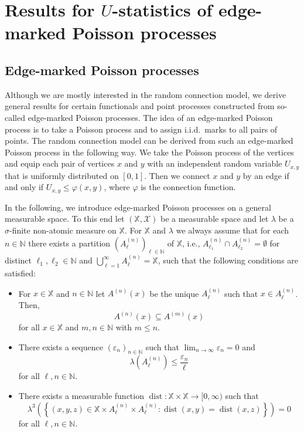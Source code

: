 \documentclass{article}
\theoremstyle{definition}
\numberwithin{equation}{section}
\theoremstyle{remark}
\begin{document}
\section{Results for $U$-statistics of edge-marked Poisson processes}\label{Sec:edge}



\subsection{Edge-marked Poisson processes}\label{subsec:edge-marked_PP}

Although we are mostly interested in the random connection model, we derive general results for certain functionals and point processes constructed from so-called edge-marked Poisson processes. The idea of an edge-marked Poisson process is to take a Poisson process and to assign i.i.d.\ marks to all pairs of points. The random connection model can be derived from such an edge-marked Poisson process in the following way. We take the Poisson process of the vertices and equip each pair of vertices $x$ and $y$ with an independent random variable $U_{x,y}$ that is uniformly distributed on $[0,1]$. Then we connect $x$ and $y$ by an edge if and only if $U_{x,y}\leq \varphi(x,y)$, where $\varphi$ is the connection function.

In the following, we introduce edge-marked Poisson processes on a general measurable space. To this end let $(\mathbb{X},\mathcal{X})$ be a measurable space and let $\lambda$ be a $\sigma$-finite non-atomic measure on $\mathbb{X}$. For $\mathbb{X}$ and $\lambda$ we always assume that for each $n\in\mathbb{N}$ there exists a partition $(A_\ell^{(n)})_{\ell\in\mathbb{N}}$ of $\mathbb{X}$, i.e., $A^{(n)}_{\ell_1}\cap A^{(n)}_{\ell_2}=\emptyset$ for distinct $\ell_1,\ell_2\in\mathbb{N}$ and $\bigcup_{\ell=1}^\infty A^{(n)}_\ell=\mathbb{X}$, such that the following conditions are satisfied:
\begin{itemize}
\item For $x\in\mathbb{X}$ and $n\in\mathbb{N}$ let $A^{(n)}(x)$ be the unique $A^{(n)}_\ell$ such that $x\in A^{(n)}_\ell$. Then,
\begin{equation}\label{eqn:monotonicity_partition}
A^{(n)}(x)\subseteq A^{(m)}(x)
\end{equation}
for all $x\in\mathbb{X}$ and $m,n\in\mathbb{N}$ with $m\leq n$.
\item There exists a sequence $(\varepsilon_n)_{n\in\mathbb{N}}$ such that $\lim_{n\to\infty}\varepsilon_n=0$ and
\begin{equation}\label{eqn:size_partition}
\lambda(A_\ell^{(n)}) \leq \frac{\varepsilon_n}{\ell}
\end{equation}
for all $\ell,n\in\mathbb{N}$.
\item There exists a measurable function $\operatorname{dist}:\mathbb{X}\times \mathbb{X}\to[0,\infty)$ such that 
\begin{equation}\label{eqn:uniqueness_distances}
\lambda^3\left(\left\{(x,y,z)\in \mathbb{X}\times A^{(n)}_\ell\times A_\ell^{(n)}: \operatorname{dist}(x,y)=\operatorname{dist}(x,z)\right\}\right)=0
\end{equation}
for all $\ell,n\in\mathbb{N}$.
\end{itemize}
\end{document}
